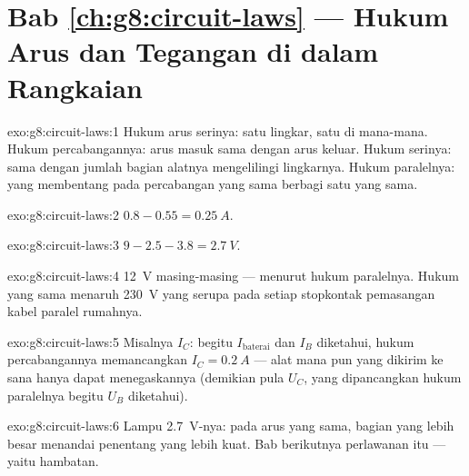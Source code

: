\section*{Bab \ref{ch:g8:circuit-laws} --- Hukum Arus dan Tegangan di dalam Rangkaian}

\begin{solution}{exo:g8:circuit-laws:1}
Hukum arus serinya: satu lingkar, satu  di mana-mana. Hukum
percabangannya: arus masuk sama dengan arus keluar. Hukum 
serinya:   sama dengan jumlah bagian alatnya
mengelilingi lingkarnya. Hukum  paralelnya:  yang
membentang pada percabangan yang sama berbagi satu  yang sama.
\end{solution}

\begin{solution}{exo:g8:circuit-laws:2}
$0.8 - 0.55 = \qty{0.25}{A}$.
\end{solution}

\begin{solution}{exo:g8:circuit-laws:3}
$9 - 2.5 - 3.8 = \qty{2.7}{V}$.
\end{solution}

\begin{solution}{exo:g8:circuit-laws:4}
\qty{12}{V} masing-masing --- menurut hukum  paralelnya. Hukum
yang sama menaruh \qty{230}{V} yang serupa pada setiap stopkontak
pemasangan kabel paralel rumahnya.
\end{solution}

\begin{solution}{exo:g8:circuit-laws:5}
Misalnya $I_C$: begitu $I_{\text{baterai}}$ dan $I_B$ diketahui,
hukum percabangannya memancangkan $I_C = \qty{0.2}{A}$ --- alat mana
pun yang dikirim ke sana hanya dapat menegaskannya (demikian pula
$U_C$, yang dipancangkan hukum  paralelnya begitu $U_B$
diketahui).
\end{solution}

\begin{solution}{exo:g8:circuit-laws:6}
Lampu \qty{2.7}{V}-nya: pada arus yang sama, bagian  yang
lebih besar menandai penentang yang lebih kuat. Bab berikutnya
 perlawanan itu --- yaitu hambatan.
\end{solution}

